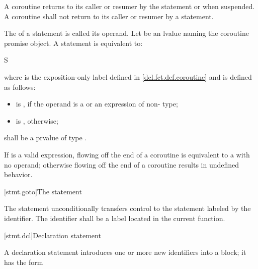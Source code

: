 \pnum
A coroutine returns to its caller or resumer
by the  statement or when suspended.
A coroutine shall not return to its caller or resumer
by a  statement.

\pnum
The  of a  statement is
called its operand.
Let  be an lvalue naming the coroutine
promise object.
A  statement is equivalent to:
\begin{ncsimplebnf}
\terminal{\{} S\terminal{;}  \terminal{;} \terminal{\}}
\end{ncsimplebnf}

where  is the exposition-only label
defined in \ref{dcl.fct.def.coroutine}
and  is defined as follows:

\begin{itemize}
\item
{} is \tcode{)},
if the operand is a  or an expression of non- type;

\item
{} is \tcode{\{}{ } \tcode{;} \tcode{;{ }\}}, otherwise;
\end{itemize}

 shall be a prvalue of type .

\pnum
If  is a valid expression,
flowing off the end of a coroutine is equivalent to a  with no operand;
otherwise flowing off the end of a coroutine results in undefined behavior.

[stmt.goto]{The  statement}%

\pnum
The  statement unconditionally transfers control to the
statement labeled by the identifier. The identifier shall be a
%
label located in the current function.

[stmt.dcl]{Declaration statement}%

\pnum
A declaration statement introduces one or more new identifiers into a
block; it has the form

